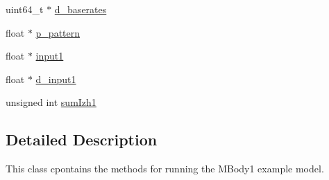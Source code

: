 \begin{DoxyCompactItemize}
\item 
uint64\+\_\+t $\ast$ \hyperlink{classclassol_adee39c3f46e3b1b691b047f7fae179c6}{d\+\_\+baserates}
\item 
float $\ast$ \hyperlink{classclassol_ab0eecc893b3ecf89505f2fd31e34403f}{p\+\_\+pattern}
\item 
float $\ast$ \hyperlink{classclassol_a5803e52deda310bbadbb22265045b8d9}{input1}
\item 
float $\ast$ \hyperlink{classclassol_a29d842c266bb5c84cdc3ef1e7d7d4e06}{d\+\_\+input1}
\item 
unsigned int \hyperlink{classclassol_a0cb78768c605c2cc8c3546e9d9e565ef}{sum\+Izh1}
\end{DoxyCompactItemize}


\subsection{Detailed Description}
This class cpontains the methods for running the M\+Body1 example model. 

